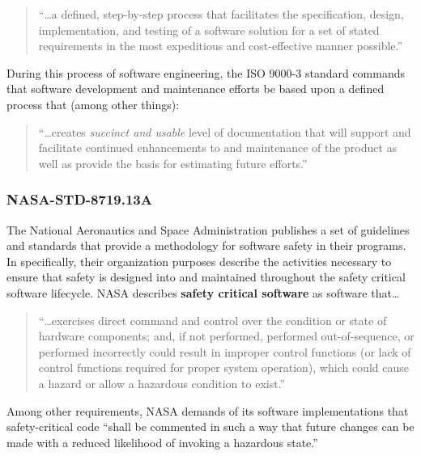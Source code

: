 \begin{quote}
``\ldots a defined, step-by-step process that facilitates the specification,
design, implementation, and testing of a software solution for a set of stated
requirements in the most expeditious and cost-effective manner possible.''
\cite{Kehoe1996}
\end{quote}

During this process of software engineering, the ISO 9000-3 standard commands
that software development and maintenance efforts be based upon a defined
process that (among other things): 

\begin{quote}
``\ldots creates \textit{succinct and usable} level of documentation that will
support and facilitate continued enhancements to and maintenance of the product
as well as provide the basis for estimating future efforts.'' \cite{Kehoe1996}
\end{quote}

\subsubsection{NASA-STD-8719.13A}
The National Aeronautics and Space Administration publishes a set of guidelines
and standards that provide a methodology for software safety in their programs.
In \cite{NASA1997} specifically, their organization purposes describe the
activities necessary to ensure that safety is designed into and maintained
throughout the safety critical software lifecycle. NASA describes \textbf{safety
critical software} as software that\ldots

\begin{quote} 
``\ldots exercises direct command and control over the condition or state of
hardware components; and, if not performed, performed out-of-sequence, or
performed incorrectly could result in improper control functions (or lack of
control functions required for proper system operation), which could cause a
hazard or allow a hazardous condition to exist.'' \cite{NASA1997}
\end{quote}

Among other requirements, NASA demands of its software implementations that
safety-critical code ``shall be commented in such a way that future changes can
be made with a reduced likelihood of invoking a hazardous state.''
